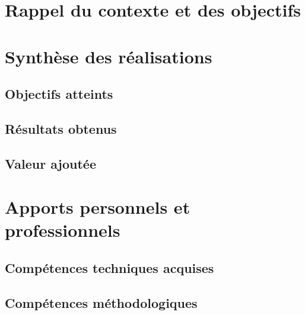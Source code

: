 

\section{Rappel du contexte et des objectifs}


\section{Synthèse des réalisations}


\subsection{Objectifs atteints}


\subsection{Résultats obtenus}


\subsection{Valeur ajoutée}


\section{Apports personnels et professionnels}


\subsection{Compétences techniques acquises}


\subsection{Compétences méthodologiques}

